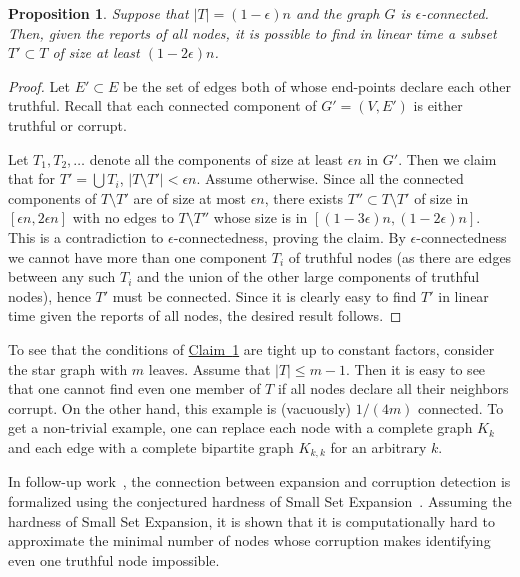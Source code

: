 \documentclass[11pt]{article}
\numberwithin{equation}{section}
\newtheorem{proposition}[theorem]{Proposition}
\theoremstyle{definition}
\theoremstyle{plain}
\newcommand{\expref}[2]{\hyperref[#2]{#1~\ref{#2}}}
\begin{document}
\begin{proposition} \label{c:41} 
%
Suppose that $|T| = (1-\epsilon)n$ and the 
graph $G$ is $\epsilon$-connected.
Then, given the reports of all nodes, 
it is possible to find  in linear time a subset
%
%
$T' \subset T$ of size at least $(1-2\epsilon) n$. 
\end{proposition}

\begin{proof}
Let $E' \subset E$ be the set of edges both of 
whose end-points declare each other truthful. 
Recall that each connected component of $G'=(V,E')$ is either truthful or corrupt. 
%
%
%
%

Let $T_1, T_2,\ldots$ denote all the components of size at least $\epsilon
n$ in $G'$. Then we claim that for $T' = \bigcup T_i$, $|T \setminus T'|
< \epsilon n$. Assume otherwise. Since all the connected components of
$T \setminus T'$ are of size at most $\epsilon n$, there exists $T''
\subset T \setminus T'$ of size in $[\epsilon n, 2 \epsilon n]$ with no
edges to 
%
$T \setminus T''$ whose size is in $[(1-3\epsilon)n ,(1-2\epsilon)
n]$. This is a contradiction to $\epsilon$-connectedness,
%
proving the claim. By $\epsilon$-connectedness we cannot have more
than one component $T_i$ of truthful nodes (as there are
edges between any such $T_i$ and the union of the other large
components of truthful nodes), hence $T'$ must be connected. Since it
is clearly easy to find $T'$ 
%
in linear time  given the reports of all nodes,
the desired result follows.
\end{proof}

To see that the conditions of \expref{Claim}{c:41} are tight up to constant
factors, consider the star graph with $m$ leaves.  Assume that 
%
$|T| \leq m-1$. 
Then it is easy to see that one cannot find even one member of $T$
if all nodes declare all their neighbors corrupt. On the other hand,
this example is (vacuously) $1/(4m)$ connected.  To get a non-trivial
example, one can replace each node with a complete graph $K_k$ and each
edge with a complete bipartite graph $K_{k,k}$ for an arbitrary $k$.

In 
%
follow-up    %
work~\cite{JiMoRa:18}, the connection between expansion and corruption detection is formalized using the conjectured hardness of Small Set Expansion~\cite{RS}. Assuming the hardness of Small Set Expansion, 
it is shown that it is computationally hard to approximate the minimal number of nodes whose corruption makes identifying even one truthful node impossible. 
\end{document}
